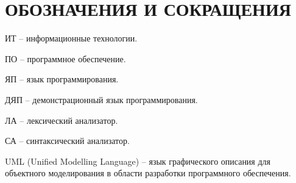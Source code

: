 \section*{ОБОЗНАЧЕНИЯ И СОКРАЩЕНИЯ}

ИТ -- информационные технологии.

ПО -- программное обеспечение.

ЯП -- язык программирования.

ДЯП -- демонстрационный язык программирования.

ЛА -- лексический анализатор.

СА -- синтаксический анализатор.

UML (Unified Modelling Language) -- язык графического описания для объектного моделирования в области разработки программного обеспечения.